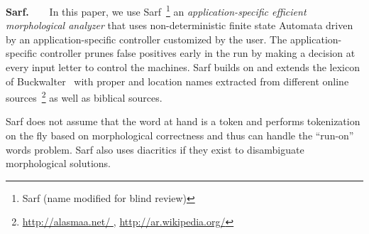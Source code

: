 \documentclass[11pt]{article}
\begin{document}

{\bf Sarf.~~~}
In this paper, 
we use Sarf~\footnote{Sarf (name modified for blind review) }
an {\em application-specific efficient
morphological analyzer} that uses 
non-deterministic finite state Automata 
driven by an application-specific controller customized 
by the user. 
The application-specific controller prunes false positives
early in the run by making a decision at every input letter
to control the machines.
Sarf builds on and extends the lexicon of 
Buckwalter~ 
with proper and location names extracted from different online 
sources~\footnote{\href{http://alasmaa.net/}{http://alasmaa.net/ }, 
\href{http://ar.wikipedia.org/}{http://ar.wikipedia.org/}}
as well as biblical sources.

Sarf does not assume that the word at hand is a token and
performs tokenization on the fly based on morphological correctness
and thus can handle 
the ``run-on'' words problem. 
Sarf also uses diacritics if they exist to disambiguate 
morphological solutions. 


\end{document}
